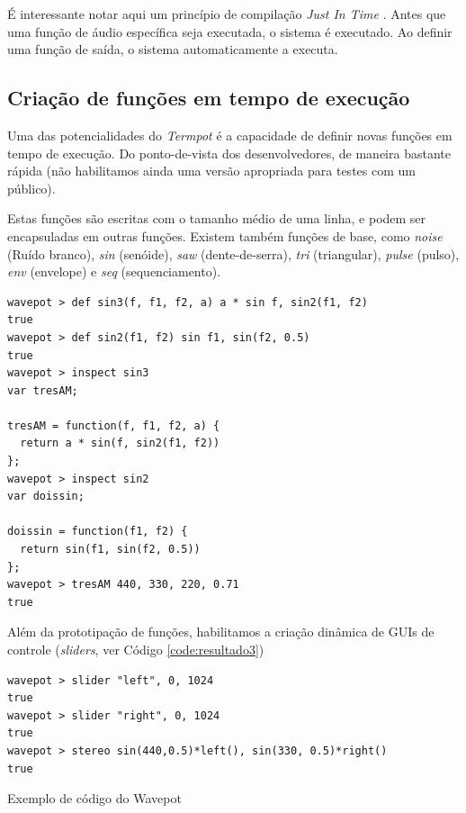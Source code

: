 É interessante notar aqui um princípio de compilação \emph{Just In Time} \cite{aycock_brief_2003}. Antes que uma função de áudio específica seja executada, o sistema é executado. Ao definir uma função de saída, o sistema automaticamente a executa.

\subsection{Criação de funções em tempo de execução}

Uma das potencialidades do \emph{Termpot} é a capacidade de definir novas funções em tempo de execução. Do ponto-de-vista dos desenvolvedores, de maneira bastante rápida (não habilitamos ainda uma versão apropriada para testes com um público). 

Estas funções são escritas com o tamanho médio de uma linha, e podem ser encapsuladas em outras funções. Existem também funções de base, como \emph{noise} (Ruído branco), \emph{sin} (senóide), \emph{saw} (dente-de-serra), \emph{tri} (triangular), \emph{pulse} (pulso), \emph{env} (envelope) e \emph{seq} (sequenciamento). 

\begin{listing}
\begin{verbatim}
wavepot > def sin3(f, f1, f2, a) a * sin f, sin2(f1, f2)
true
wavepot > def sin2(f1, f2) sin f1, sin(f2, 0.5)
true
wavepot > inspect sin3
var tresAM;

tresAM = function(f, f1, f2, a) {
  return a * sin(f, sin2(f1, f2))
};
wavepot > inspect sin2
var doissin;

doissin = function(f1, f2) {
  return sin(f1, sin(f2, 0.5))
};
wavepot > tresAM 440, 330, 220, 0.71
true
\end{verbatim}
\label{code:resultado2}
\end{listing}

Além da prototipação de funções, habilitamos a criação dinâmica de GUIs de controle (\emph{sliders}, ver Código \ref{code:resultado3})

\begin{listing}
\begin{verbatim}
wavepot > slider "left", 0, 1024
true
wavepot > slider "right", 0, 1024
true
wavepot > stereo sin(440,0.5)*left(), sin(330, 0.5)*right()
true
\end{verbatim}
\caption{Exemplo de código do Wavepot}
\label{code:resultado3}
\end{listing}

